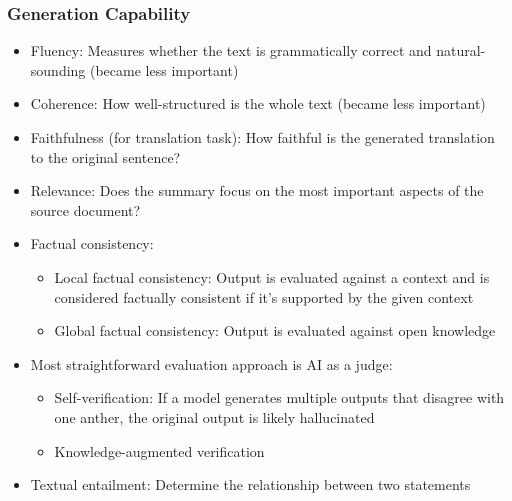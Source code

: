 \documentclass[11pt]{scrartcl}
\begin{document}
\subsubsection*{Generation Capability}
\begin{itemize}
	\item Fluency: Measures whether the text is grammatically correct and natural-sounding (became less important)
	\item Coherence: How well-structured is the whole text (became less important)
	\item Faithfulness (for translation task): How faithful is the generated translation to the original sentence?
	\item Relevance: Does the summary focus on the most important aspects of the source document?
	\item Factual consistency:
	\begin{itemize}
		\item Local factual consistency: Output is evaluated against a context and is considered factually consistent if it's supported by the given context
		\item Global factual consistency: Output is evaluated against open knowledge
	\end{itemize}
	\item Most straightforward evaluation approach is AI as a judge:
	\begin{itemize}
		\item Self-verification: If a model generates multiple outputs that disagree with one anther, the original output is likely hallucinated
		\item Knowledge-augmented verification
	\end{itemize}
	\item Textual entailment: Determine the relationship between two statements
\end{itemize}
\end{document}
